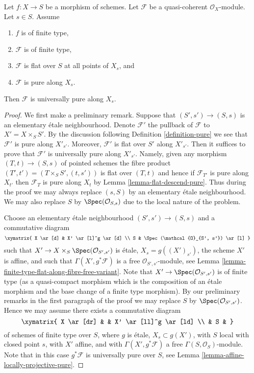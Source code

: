 \begin{lemma}
\label{lemma-finite-type-flat-pure-along-fibre-is-universal}
Let $f : X \to S$ be a morphism of schemes.
Let $\mathcal{F}$ be a quasi-coherent $\mathcal{O}_X$-module.
Let $s \in S$.
Assume
\begin{enumerate}
\item $f$ is of finite type,
\item $\mathcal{F}$ is of finite type,
\item $\mathcal{F}$ is flat over $S$ at all points of $X_s$, and
\item $\mathcal{F}$ is pure along $X_s$.
\end{enumerate}
Then $\mathcal{F}$ is universally pure along $X_s$.
\end{lemma}

\begin{proof}
We first make a preliminary remark. Suppose that $(S', s') \to (S, s)$
is an elementary \'etale neighbourhood. Denote $\mathcal{F}'$ the
pullback of $\mathcal{F}$ to $X' = X \times_S S'$.
By the discussion following
Definition \ref{definition-pure}
we see that $\mathcal{F}'$ is pure along $X'_{s'}$. Moreover, $\mathcal{F}'$
is flat over $S'$ along $X'_{s'}$. Then it suffices to prove
that $\mathcal{F}'$ is universally pure along $X'_{s'}$. Namely, given
any morphism $(T, t) \to (S, s)$ of pointed schemes
the fibre product $(T', t') = (T \times_S S', (t, s'))$ is flat over $(T, t)$
and hence if $\mathcal{F}_{T'}$ is pure along $X_{t'}$ then
$\mathcal{F}_T$ is pure along $X_t$ by
Lemma \ref{lemma-flat-descend-pure}.
Thus during the proof we may always replace $(s, S)$ by an elementary
\'etale neighbourhood.
We may also replace $S$ by $\Spec(\mathcal{O}_{S, s})$
due to the local nature of the problem.

\medskip\noindent
Choose an elementary \'etale neighbourhood $(S', s') \to (S, s)$ and
a commutative diagram
$$
\xymatrix{
X \ar[d] & X' \ar[l]^g \ar[d] \\
S & \Spec(\mathcal{O}_{S', s'}) \ar[l]
}
$$
such that $X' \to X \times_S \Spec(\mathcal{O}_{S', s'})$
is \'etale, $X_s = g((X')_{s'})$, the scheme $X'$ is affine,
and such that $\Gamma(X', g^*\mathcal{F})$ is a free
$\mathcal{O}_{S', s'}$-module, see
Lemma \ref{lemma-finite-type-flat-along-fibre-free-variant}.
Note that $X' \to \Spec(\mathcal{O}_{S', s'})$ is of finite type
(as a quasi-compact morphism which is the composition of an \'etale morphism
and the base change of a finite type morphism).
By our preliminary remarks in the first paragraph of the proof
we may replace $S$ by $\Spec(\mathcal{O}_{S', s'})$. Hence
we may assume there exists a commutative diagram
$$
\xymatrix{
X \ar[dr] & & X' \ar[ll]^g \ar[ld] \\
& S &
}
$$
of schemes of finite type over $S$, where $g$ is \'etale, $X_s \subset g(X')$,
with $S$ local with closed point $s$, with $X'$ affine, and with
$\Gamma(X', g^*\mathcal{F})$ a free $\Gamma(S, \mathcal{O}_S)$-module.
Note that in this case $g^*\mathcal{F}$ is universally pure over $S$, see
Lemma \ref{lemma-affine-locally-projective-pure}.


\end{proof}
